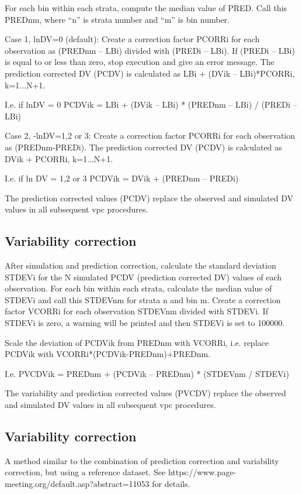 For each bin within each strata, compute the median value of PRED. Call this PREDnm, where “n” is strata number and “m” is bin number. 

Case 1, lnDV=0 (default): Create a correction factor PCORRi for each observation as (PREDnm – LBi) divided with (PREDi – LBi). If (PREDi – LBi) is equal to or less than zero, stop execution and give an error message. The prediction corrected DV (PCDV) is calculated as 
LBi + (DVik – LBi)*PCORRi, k=1...N+1. 

I.e. if lnDV = 0		PCDVik = LBi + (DVik – LBi) * (PREDnm – LBi) / (PREDi – LBi)

Case 2, -lnDV=1,2 or 3: Create a correction factor PCORRi for each observation as (PREDnm-PREDi). The prediction corrected DV (PCDV) is calculated as DVik + PCORRi, k=1...N+1.   

I.e. if ln DV = 1,2 or 3	PCDVik = DVik + (PREDnm – PREDi)

The prediction corrected values (PCDV) replace the observed and simulated DV values in all subsequent vpc procedures.

\subsection{Variability correction}
After simulation and prediction correction, calculate the standard deviation STDEVi for  the N simulated PCDV (prediction corrected DV) values of each observation. For each bin within each strata, calculate the median value of STDEVi and call this STDEVnm for strata n and bin m. Create a correction factor VCORRi for each observation STDEVnm divided with STDEVi. If STDEVi is zero, a warning will be printed and then STDEVi is set to 100000.

Scale the deviation of PCDVik from PREDnm with VCORRi, i.e. replace PCDVik with VCORRi*(PCDVik-PREDnm)+PREDnm. 

I.e. 	PVCDVik = PREDnm + (PCDVik – PREDnm) * (STDEVnm / STDEVi)

The variability and prediction corrected values (PVCDV) replace the observed and simulated DV values in all subsequent vpc procedures.

\subsection{Variability correction}
A method similar to the combination of prediction correction and variability correction, but using a reference dataset. See https://www.page-meeting.org/default.asp?abstract=11053 for details.

